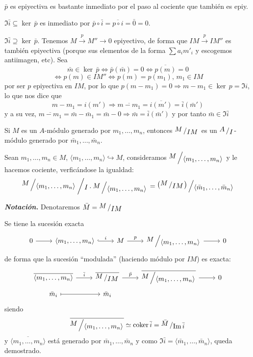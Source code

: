     \begin{dem}
        $\bar p$ es epiyectiva es bastante inmediato por el paso al cociente que tambi\'en es epiy.

        $\Im \bar i \subseteq \ker\, \bar p$ es inmediato por $\bar p \circ \bar i = \overline{p \circ i} = \bar 0 = 0$.

        $\Im \bar i \supseteq \ker\, \bar p$. Tenemos $M \overset{p}{\longrightarrow}M'' \longrightarrow 0$ epiyectivo, de forma que $IM \overset{p}{\longrightarrow} IM''$ es tambi\'en epiyectiva (porque sus elementos de la forma $\sum a_i m'_i$ y escogemos antiimagen, etc).  
        Sea  $$\bar m \in \ker\, \bar p \iff \bar p (\bar m) =0 \iff \overline{p(m)}=0 $$
        $$\iff p(m)\in IM'' \iff p(m) = p(m_1), \, m_1 \in IM$$ 
        por ser $p$ epiyectiva en $IM$, por lo que $p(m-m_1) = 0 \Rightarrow m-m_1\in \ker\, p = \Im i$, lo que nos dice que $$m-m_1 = i(m') \Rightarrow \overline{m-m_1} = \overline{i(m')} = \bar i (\bar m')$$ y a su vez, $\overline{m-m_1} = \bar m - \bar m_1 = \bar m-0 \Rightarrow\bar m = \bar i (\bar m')$ y por tanto $\bar m \in \Im \bar i$
    \end{dem}    
Si $M$ es un $A$-m\'odulo generado por $m_1, \ldots, m_n$, entonces $\modulo{M}{IM}$ es un $\modulo{A}{I}$-m\'odulo generado por $\bar m_1, \ldots, \bar m_n$. 
\begin{cor}
Sean $m_1, \ldots, m_n\in M$, $\langle m_1, \ldots, m_n \rangle \hookrightarrow M$, consideramos $\modulo{M}{\langle m_1, \ldots, m_n \rangle}$ y le hacemos cociente, verfic\'andose la igualdad:
$$\modulo{\modulo{M}{\langle m_1, \ldots, m_n \rangle}}{I \cdot \modulo{M}{\langle m_1, \ldots, m_n \rangle} } = \modulo{\left(\modulo{M}{IM}\right)}{\langle \bar m_1, \ldots, \bar m_n \rangle}$$
\end{cor}

\noindent\textbf{\textit{Notaci\'on.}}
    Denotaremos $\bar M = \modulo{M}{IM}$

\begin{dem} Se tiene la sucesi\'on exacta
    $$\bt 0 \arrow{r} & \langle m_1, \ldots, m_n \rangle \arrow[hook]{r}{i} & M \arrow{r}{p} & \modulo{M}{\langle m_1, \ldots, m_n \rangle} \arrow{r} & 0 \et$$
    de forma que la sucesi\'on ``modulada'' (haciendo m\'odulo por $IM$) es exacta:
    $$\bt \overline{\langle m_1, \ldots, m_n \rangle} \arrow{r}{\bar i} & \overline{\modulo{M}{IM}} \arrow{r}{\bar p} & \overline{\modulo{M}{\langle m_1, \ldots, m_n \rangle}} \arrow{r} & 0 \\[-5mm] \bar m_i \arrow[mapsto]{r} & \bar m_i \et$$
    siendo 
    $$\overline{\modulo{M}{\langle m_1, \ldots, m_n \rangle}}  \simeq \coker \bar i = \modulo{\bar M}{\Im \bar i}$$
    y $\overline{\langle m_1, \ldots, m_n \rangle}$ est\'a generado por $\bar m_1 , \ldots, \bar m_n$ y como $\Im \bar i = \langle \bar m_1 , \ldots, \bar m_n \rangle$, queda demostrado. 
\end{dem}

